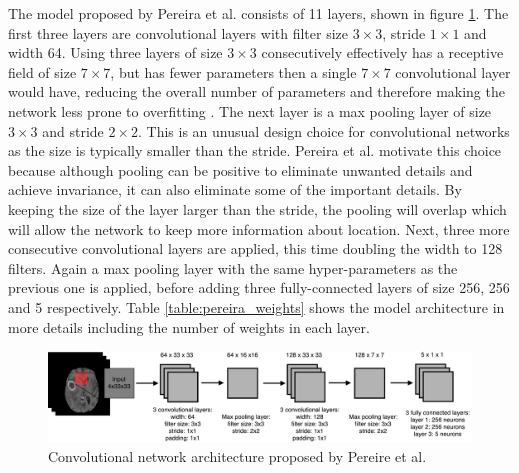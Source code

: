 \documentclass[12pt,a4paper,twoside,openright]{report}
\begin{document}
The model proposed by Pereira et al. \cite{pereira} consists of 11 layers, shown in figure \ref{fig:pereira_model}. The first three layers are convolutional layers with filter size $3 \times 3$, stride $1 \times 1$ and width 64. Using three layers of size $3 \times 3$ consecutively effectively has a receptive field of size $7 \times 7$, but has fewer parameters then a single $7 \times 7$ convolutional layer would have, reducing the overall number of parameters and therefore making the network less prone to overfitting \cite{very_deep_conv_nets}. The next layer is a max pooling layer of size $3 \times 3$ and stride $2 \times 2$. This is an unusual design choice for convolutional networks as the size is typically smaller than the stride. Pereira et al. motivate this choice because although pooling can be positive to eliminate unwanted details and achieve invariance, it can also eliminate some of the important details. By keeping the size of the layer larger than the stride, the pooling will overlap which will allow the network to keep more information about location. Next, three more consecutive convolutional layers are applied, this time doubling the width to 128 filters. Again a max pooling layer with the same hyper-parameters as the previous one is applied, before adding three fully-connected layers of size 256, 256 and 5 respectively. Table \ref{table:pereira_weights} shows the model architecture in more details including the number of weights in each layer. 

\begin{figure}
	\centering
	\includegraphics[width=\textwidth]{pereira_model}
	\caption{Convolutional network architecture proposed by Pereire et al.}
	\label{fig:pereira_model}
\end{figure}
\end{document}
